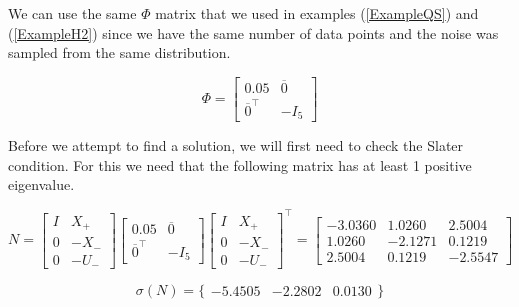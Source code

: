We can use the same $\Phi$ matrix that we used in examples (\ref{ExampleQS}) and (\ref{ExampleH2}) since we have the same number of data points and the noise was sampled from the same distribution. 

\begin{equation*}
\Phi = \begin{bmatrix} 0.05 & \overline{0} \\ \overline{0}^\top & -I_5 \end{bmatrix}
\end{equation*}

Before we attempt to find a solution, we will first need to check the Slater condition. For this we need that the following matrix has at least 1 positive eigenvalue.

\begin{equation*}
N = 
\begin{bmatrix} I&X_+ \\ 0 & -X_- \\ 0&-U_- \end{bmatrix}
\begin{bmatrix} 0.05 & \overline{0} \\ \overline{0}^\top & -I_5 \end{bmatrix}
\begin{bmatrix} I&X_+ \\ 0 & -X_- \\ 0&-U_- \end{bmatrix}^\top 
=
\begin{bmatrix} 
	-3.0360 &   1.0260 &   2.5004 \\
 	 1.0260 &  -2.1271 &   0.1219 \\
 	 2.5004 &   0.1219 &  -2.5547
\end{bmatrix} 
\end{equation*}

\begin{equation*}
\sigma(N) = \{ \begin{array}{ccc}
	-5.4505 & -2.2802 & 0.0130
\end{array} \}
\end{equation*}

